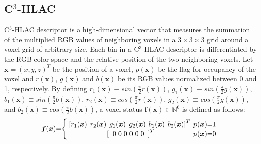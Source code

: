 \documentclass[a4paper, 10 pt, conference]{sty/ieeeconf}
\begin{document}
\subsection{C$^3$-HLAC}
\label{sec:color_chlac}
C$^3$-HLAC descriptor is a high-dimensional vector that measures the summation of the 
multiplied RGB values of neighboring voxels in a $3 \times 3 \times 3$ grid around a voxel grid of arbitrary size. 
Each bin in a C$^3$-HLAC descriptor is differentiated by the RGB color space and the 
relative position of the two neighboring voxels. 
Let $\bm{x}=(x,y,z)^T$ be the position of a voxel, $p(\bm{x})$ be the flag for occupancy 
of the voxel and $r(\bm{x})$, $g(\bm{x})$ and $b(\bm{x})$ be its RGB values normalized 
between 0 and 1, respectively.  By defining 
$r_1(\bm{x}) \equiv sin\left( \frac{\pi}{2}r(\bm{x})\right)$, $g_1(\bm{x}) \equiv sin\left( \frac{\pi}{2}g(\bm{x})\right)$, $b_1(\bm{x}) \equiv sin\left( \frac{\pi}{2}b(\bm{x})\right)$, 
$r_2(\bm{x}) \equiv cos\left( \frac{\pi}{2}r(\bm{x})\right)$, $g_2(\bm{x}) \equiv cos\left( \frac{\pi}{2}g(\bm{x})\right)$, and $b_2(\bm{x}) \equiv cos\left( \frac{\pi}{2}b(\bm{x})\right)$, 
a voxel status $\bm{f}(\bm{x})\in \mathbb{N}^6$ is defined as follows: 
\begin{eqnarray*}
  \bm{f}({\bm x})\hspace{-1mm}=\hspace{-1mm}\left\{
  \begin{array}{cc}
    \hspace{-1mm}
    \left[r_1({\bm x})\hspace{1.5mm} r_2(\bm{x}) \hspace{1.5mm}g_1({\bm x}) \hspace{1.5mm}g_2({\bm x}) \hspace{1.5mm}b_1({\bm x}) \hspace{1.5mm}b_2({\bm x})\right]^T & \hspace{-2mm}p({\bm x})\hspace{-1mm}=\hspace{-1mm}1 \\
    \left[\hspace{2mm} 0\hspace{1mm}0\hspace{1mm}0\hspace{1mm}0\hspace{1mm}0\hspace{1mm}0 \hspace{2mm} \right]^T & \hspace{-2mm}p({\bm x})\hspace{-1mm}=\hspace{-1mm}0
  \end{array}\right.
\end{eqnarray*}
\end{document}
